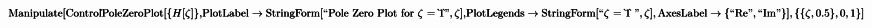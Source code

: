 \documentclass{article}
\begin{document}
\begin{doublespace}
\noindent\(\pmb{\text{Manipulate}[\text{Control$\grave{ }$PoleZeroPlot}[\{H[\zeta ]\},}\\
\pmb{\text{PlotLabel}\to \text{StringForm}[\text{{``}Pole Zero Plot for $\zeta $ = $\grave{ }$1$\grave{ }${''}},\zeta ],}\\
\pmb{\text{PlotLegends}\to \text{StringForm}[\text{{``}$\zeta $ = $\grave{ }$1$\grave{ }$ {''}},\zeta ],\text{AxesLabel}\to \{\text{{``}Re{''}},\text{{``}Im{''}}\}],\{\{\zeta
,0.5\},0,1\}]}\)

\end{doublespace}

\begin{doublespace}
\noindent\(\)
\end{doublespace}
\end{document}
